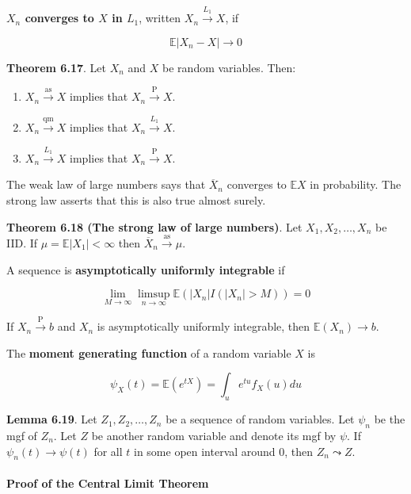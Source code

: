 \textbf{\(X_{n}\) converges to \(X\) in \(L_{1}\)}, written
\(X_{n} \xrightarrow{L_{1}} X\), if

\[ \mathbb{E} |X_{n} - X| \rightarrow 0 \]

\textbf{Theorem 6.17}. Let \(X_{n}\) and \(X\) be random variables. Then:

\begin{enumerate}[tightlist,label={\arabic*.}]
\item
  \(X_{n} \xrightarrow{\text{as}} X\) implies that
  \(X_{n} \xrightarrow{\text{P}} X\).
\item
  \(X_{n} \xrightarrow{\text{qm}} X\) implies that
  \(X_{n} \xrightarrow{L_{1}} X\).
\item
  \(X_{n} \xrightarrow{L_{1}} X\) implies that
  \(X_{n} \xrightarrow{\text{P}} X\).
\end{enumerate}

The weak law of large numbers says that \(\overline{X}_{n}\) converges to
\(\mathbb{E} X\) in probability. The strong law asserts that this is
also true almost surely.

\textbf{Theorem 6.18 (The strong law of large numbers)}. Let
\(X_{1}, X_{2}, \dots, X_{n}\) be IID. If \(\mu = \mathbb{E}|X_{1}| < \infty\)
then \(\overline{X}_{n} \xrightarrow{\text{as}} \mu\).

A sequence is \textbf{asymptotically uniformly integrable} if

\[ \lim _{M \rightarrow \infty} \limsup _{n \rightarrow \infty} \mathbb{E} ( |X_{n}| I(|X_{n}| > M) ) = 0 \]

If \(X_{n} \xrightarrow{\text{P}} b\) and \(X_{n}\) is asymptotically
uniformly integrable, then \(\mathbb{E}(X_{n}) \rightarrow b\).

The \textbf{moment generating function} of a random variable \(X\) is

\[\psi_X(t) = \mathbb{E}(e^{tX}) = \int_u e^{tu} f_X(u) du\]

\textbf{Lemma 6.19}. Let \(Z_{1}, Z_{2}, \dots, Z_{n}\) be a sequence of
random variables. Let \(\psi_{n}\) be the mgf of \(Z_{n}\). Let \(Z\) be
another random variable and denote its mgf by \(\psi\). If
\(\psi_{n}(t) \rightarrow \psi(t)\) for all \(t\) in some open interval
around 0, then \(Z_{n} \leadsto Z\).

\paragraph{Proof of the Central Limit
Theorem}\label{proof-of-the-central-limit-Theorem}


